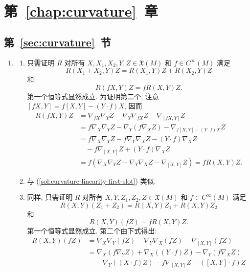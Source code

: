 \section{\texorpdfstring{第~\ref{chap:curvature}~章}{曲率}}\label{sec:solutions-curvature-chapter}
\subsection{\texorpdfstring{第~\ref{sec:curvature}~节}{曲率}}\label{subsec:solutions-curvature}

\begin{description}[font=\normalfont,leftmargin=2em,labelwidth=1.5em]
\begin{enumerate}[label=(\alph*),ref=\alph*,leftmargin=*]
\item
\begin{enumerate}[label=(\roman*),ref=\roman*,leftmargin=*]
\item\label{sol:curvature-linearity-first-slot} 只需证明 $R$ 对所有 $X,X_1,X_2,Y,Z\in\mathfrak X(M)$ 和 $f\in C^\infty(M)$ 满足
\[
  R(X_1+X_2,Y)Z=R(X_1,Y)Z+R(X_2,Y)Z
\]
和
\[
  R(fX,Y)Z=fR(X,Y)Z.
\]
第一个恒等式显然成立. 为证明第二个, 注意 $[fX,Y]=f[X,Y]-(Y\cdot f)X$, 因而
\begin{align*}
  R(fX,Y)Z&=\nabla_{fX}\nabla_YZ-\nabla_Y\nabla_{fX}Z-\nabla_{[fX,Y]}Z\\
  &=f\nabla_X\nabla_YZ-\nabla_Y(f\nabla_XZ)-\nabla_{f[X,Y]-(Y\cdot f)X}Z\\
  &=f\nabla_X\nabla_YZ-f\nabla_Y\nabla_XZ-(Y\cdot f)\nabla_XZ\\
  &\quad-f\nabla_{[X,Y]}Z+(Y\cdot f)\nabla_XZ\\
  &=f(\nabla_X\nabla_YZ-\nabla_Y\nabla_XZ-\nabla_{[X,Y]}Z)=fR(X,Y)Z.
\end{align*}
\item 与 (\ref{sol:curvature-linearity-first-slot}) 类似.
\item 同样, 只需证明 $R$ 对所有 $X,Y,Z_1,Z_2,Z\in\mathfrak X(M)$ 和 $f\in C^\infty(M)$ 满足
\[
  R(X,Y)(Z_1+Z_2)=R(X,Y)Z_1+R(X,Y)Z_2
\]
和
\[
  R(X,Y)(fZ)=fR(X,Y)Z.
\]
第一个恒等式显然成立. 第二个由下式得出:
\begin{align*}
  R(X,Y)(fZ)&=\nabla_X\nabla_Y(fZ)-\nabla_Y\nabla_X(fZ)-\nabla_{[X,Y]}(fZ)\\
  &=\nabla_X(f\nabla_YZ)+\nabla_X((Y\cdot f)Z)-\nabla_Y(f\nabla_XZ)\\
  &\quad-\nabla_Y((X\cdot f)Z)-f\nabla_{[X,Y]}Z-([X,Y]\cdot f)Z\\

\end{align*}
\end{enumerate}
\end{enumerate}
\end{description}
